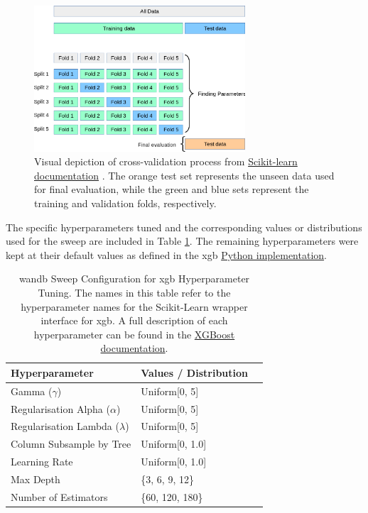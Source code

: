\begin{figure}[h]
    \centering
    \includegraphics[width=0.7\textwidth]{../figures/static/grid_search_cross_validation.png}
    \caption{Visual depiction of cross-validation process from \href{https://scikit-learn.org/stable/modules/cross_validation.html}{Scikit-learn documentation} \citep{Pedregosa2011}. The orange test set represents the unseen data used for final evaluation, while the green and blue sets represent the training and validation folds, respectively.}
    \label{fig:cross_validation_process}
\end{figure}

The specific hyperparameters tuned and the corresponding values or distributions used for the sweep are included in Table \ref{tab:wandb-sweep-config}. The remaining hyperparameters were kept at their default values as defined in the \acrshort{xgb} \href{https://xgboost.readthedocs.io/en/stable/python/python_api.html\#module-xgboost.sklearn}{Python implementation}.

\begin{table}[!ht]
    \centering
    \caption{\acrshort{wandb} Sweep Configuration for \acrshort{xgb} Hyperparameter Tuning. The names in this table refer to the hyperparameter names for the Scikit-Learn wrapper interface for \acrshort{xgb}. A full description of each hyperparameter can be found in the \href{https://xgboost.readthedocs.io/en/stable/python/python_api.html\#module-xgboost.sklearn}{XGBoost documentation}.}
    \label{tab:wandb-sweep-config}
    \begin{tabular}{llr}     
        \toprule
        \textbf{Hyperparameter} & \textbf{Values / Distribution} \\ 
        \midrule
        Gamma ($\gamma$) & Uniform[0, 5] \\
        Regularisation Alpha ($\alpha$) & Uniform[0, 5] \\
        Regularisation Lambda ($\lambda$) & Uniform[0, 5] \\
        Column Subsample by Tree & Uniform[0, 1.0] \\
        Learning Rate & Uniform[0, 1.0] \\
        Max Depth & \{3, 6, 9, 12\} \\
        Number of Estimators & \{60, 120, 180\} \\
        \bottomrule
    \end{tabular}
\end{table}

